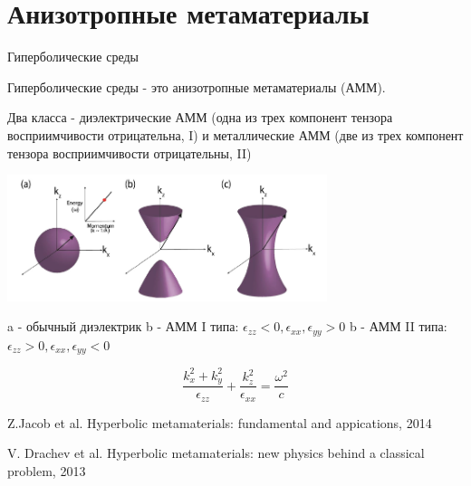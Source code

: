 \documentclass[9pt, compress, xcolor=table]{beamer}
\begin{document}
\section{Анизотропные метаматериалы}

\begin{frame}{Гиперболические среды}

Гиперболические среды - это анизотропные метаматериалы (АММ).

Два класса - диэлектрические АММ (одна из трех компонент тензора восприимчивости отрицательна, I) и металлические АММ (две из трех компонент тензора восприимчивости отрицательны, II)

\begin{center}
\includegraphics[width=0.7\textwidth]{neg_ref_n5}

 a - обычный диэлектрик
b - АММ I типа: $\epsilon_{zz}<0, \epsilon_{xx},\epsilon_{yy}>0$
b - АММ II типа: $\epsilon_{zz}>0, \epsilon_{xx},\epsilon_{yy}<0$
\end{center}
\begin{equation*}
\frac{k_x^2+k_y^2}{\epsilon_{zz}}+\frac{k_z^2}{\epsilon_{xx}}=\frac{\omega^2}{c}
\end{equation*}

{\scriptsize Z.Jacob et al. Hyperbolic metamaterials: fundamental and appications, 2014

V. Drachev et al. Hyperbolic metamaterials: new physics behind a classical problem, 2013}
\end{frame}
\end{document}
